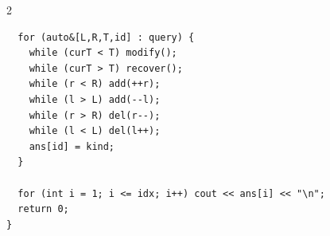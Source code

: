 \documentclass[10pt]{article}
\begin{document}
\begin{multicols*}{2}
\begin{verbatim}
  for (auto&[L,R,T,id] : query) {
    while (curT < T) modify();
    while (curT > T) recover();
    while (r < R) add(++r);
    while (l > L) add(--l);
    while (r > R) del(r--);
    while (l < L) del(l++);
    ans[id] = kind;
  }

  for (int i = 1; i <= idx; i++) cout << ans[i] << "\n";
  return 0;
}
\end{verbatim}




\end{multicols*}
\end{document}
